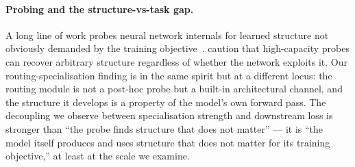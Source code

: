 \paragraph{Probing and the structure-vs-task gap.}
A long line of work probes neural network internals for learned structure not obviously demanded by the training objective~\citep{alain2017understanding,hewitt2019designing,belinkov2022probing}. \citet{hewitt2019designing} caution that high-capacity probes can recover arbitrary structure regardless of whether the network exploits it. Our routing-specialisation finding is in the same spirit but at a different locus: the routing module is not a post-hoc probe but a built-in architectural channel, and the structure it develops is a property of the model's own forward pass. The decoupling we observe between specialisation strength and downstream loss is stronger than ``the probe finds structure that does not matter'' --- it is ``the model itself produces and uses structure that does not matter for its training objective,'' at least at the scale we examine.
